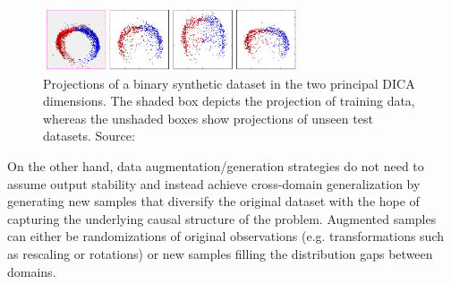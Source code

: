 \begin{figure}[H]
    \centering
    \includegraphics[width=0.67\textwidth]{img/introduction/dica.png}
    \caption{
    Projections of a binary synthetic dataset in the two principal DICA
    dimensions. The shaded box depicts the projection of training 
    data, whereas the unshaded boxes show projections of unseen 
    test datasets. Source: \cite{muandetDomainGeneralizationInvariant2013}
    }
    \label{fig:dica}
\end{figure}

On the other hand, data augmentation/generation strategies 
do not need to assume output stability and instead 
achieve cross-domain generalization by generating new samples that
diversify the original dataset with the hope of capturing 
the underlying causal structure of the problem. Augmented samples
can either be randomizations of original observations (e.g. transformations
such as rescaling or rotations) or new samples filling the distribution
gaps between domains. \\

